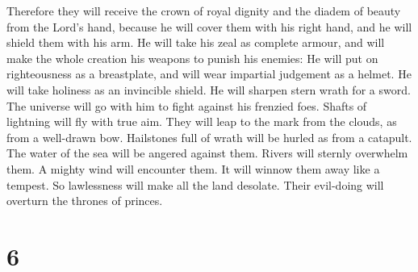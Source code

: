Therefore they will receive the crown of royal dignity and the diadem of
beauty from the Lord's hand, because he will cover them with his right
hand, and he will shield them with his arm.  He will take
his zeal as complete armour, and will make the whole creation his
weapons to punish his enemies:  He will put on
righteousness as a breastplate, and will wear impartial judgement as a
helmet.  He will take holiness as an invincible shield.
 He will sharpen stern wrath for a sword. The universe will
go with him to fight against his frenzied foes.  Shafts of
lightning will fly with true aim. They will leap to the mark from the
clouds, as from a well-drawn bow.  Hailstones full of wrath
will be hurled as from a catapult. The water of the sea will be angered
against them. Rivers will sternly overwhelm them.  A mighty
wind will encounter them. It will winnow them away like a tempest. So
lawlessness will make all the land desolate. Their evil-doing will
overturn the thrones of princes.

\hypertarget{section-5}{%
\section{6}\label{section-5}}

